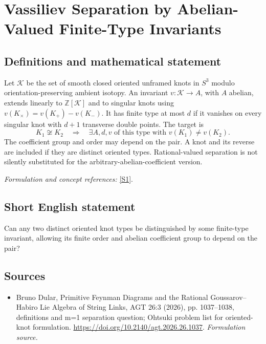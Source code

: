 \documentclass[11pt]{article}
\begin{document}
\section*{\texorpdfstring{Vassiliev Separation by Abelian-Valued Finite-Type Invariants}{Vassiliev Separation by Abelian-Valued Finite-Type Invariants}}\label{288}
\subsection{Definitions and mathematical statement}
Let $\mathcal K$ be the set of smooth closed oriented unframed knots in $S^3$ modulo orientation-preserving ambient isotopy. An invariant $v:\mathcal K\to A$, with $A$ abelian, extends linearly to ${\mathbb{Z}}[\mathcal K]$ and to singular knots using
$v(K_\times)=v(K_+)-v(K_-)$. It has finite type at most $d$ if it vanishes on every singular knot with $d+1$ transverse double points. The target is
\[
 K_1\not\cong K_2\quad\Longrightarrow\quad
 \exists A,d,v\text{ of this type with }v(K_1)\ne v(K_2).
\]
The coefficient group and order may depend on the pair. A knot and its reverse are included if they are distinct oriented types. Rational-valued separation is not silently substituted for the arbitrary-abelian-coefficient version.
\par\smallskip\textit{Formulation and concept references:} \href{https://doi.org/10.2140/agt.2026.26.1037}{[S1]}.

\subsection{Short English statement}
Can any two distinct oriented knot types be distinguished by some finite-type invariant, allowing its finite order and abelian coefficient group to depend on the pair?
\subsection{Sources}
\begin{itemize}
\item[S1]Bruno Dular, Primitive Feynman Diagrams and the Rational Goussarov–Habiro Lie Algebra of String Links, AGT 26:3 (2026), pp. 1037–1038, definitions and m=1 separation question; Ohtsuki problem list for oriented-knot formulation.
\url{https://doi.org/10.2140/agt.2026.26.1037}.
\textit{Formulation source.}
\end{itemize}
\end{document}
